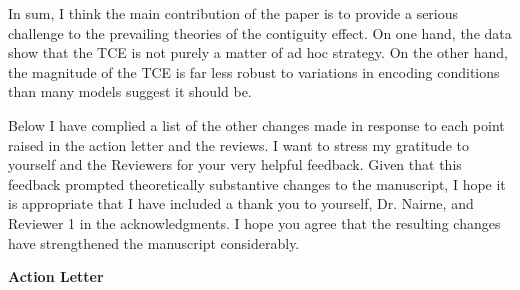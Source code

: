 \documentclass[12pt]{article}
\begin{document}
In sum, I think the main contribution of the paper is to provide a serious challenge to the prevailing theories of the contiguity effect. On one hand, the data show that the TCE is not purely a matter of ad hoc strategy. On the other hand, the magnitude of the TCE is far less robust to variations in encoding conditions than many models suggest it should be. 

Below I have complied a list of the other changes made in response to each point raised in the action letter and the reviews. I want to stress my gratitude to yourself and the Reviewers for your very helpful feedback. Given that this feedback prompted theoretically substantive changes to the manuscript, I hope it is appropriate that I have included a thank you to yourself, Dr. Nairne, and Reviewer 1 in the acknowledgments. I hope you agree that the resulting changes have strengthened the manuscript considerably.

\vspace{20pt}

\textbf{\large{Action Letter}}
\end{document}
